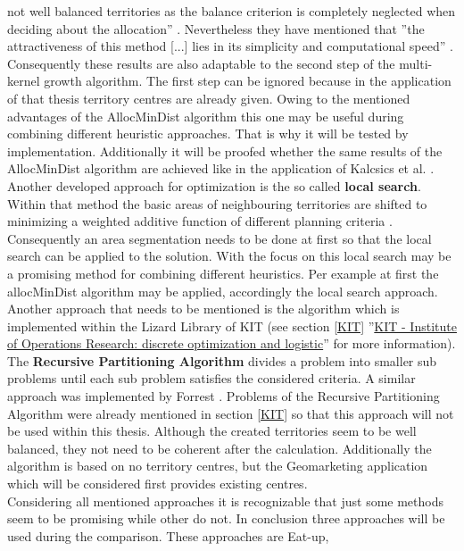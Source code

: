 not well balanced territories as the balance criterion is completely neglected when deciding about the allocation'' \cite{kalcsics2}. Nevertheless they have mentioned that ''the attractiveness of this method [...] lies in its simplicity and computational speed'' \cite{kalcsics2}. Consequently these results are also adaptable to the second step of the multi-kernel growth algorithm. The first step can be ignored because in the application of that thesis territory centres are already given. Owing to the mentioned advantages of the AllocMinDist algorithm this one may be useful during combining different heuristic approaches. That is why it will be tested by implementation. Additionally it will be proofed whether the same results of the AllocMinDist algorithm are achieved like in the application of Kalcsics et al. \cite{kalcsics2}. \\
Another developed approach for optimization is the so called \textbf{local search}. Within that method the basic areas of neighbouring territories are shifted to minimizing a weighted additive function of different planning criteria \cite{kalcsics}. Consequently an area segmentation needs to be done at first so that the local search can be applied to the solution. With the focus on this local search may be a promising method for combining different heuristics. Per example at first the allocMinDist algorithm may be applied, accordingly the local search approach. \\
Another approach that needs to be mentioned is the algorithm which is implemented within the Lizard Library of KIT (see section \ref{KIT} ''\hyperref[KIT]{KIT - Institute of Operations Research: discrete optimization and logistic}'' for more information). The \textbf{Recursive Partitioning Algorithm} divides a problem into smaller sub problems until each sub problem satisfies the considered criteria. A similar approach was implemented by Forrest \cite{forrest}. Problems of the Recursive Partitioning Algorithm were already mentioned in section \ref{KIT} so that this approach will not be used within this thesis. Although the created territories seem to be well balanced, they not need to be coherent after the calculation. Additionally the algorithm is based on no territory centres, but the Geomarketing application which will be considered first provides existing centres. \\
Considering all mentioned approaches it is recognizable that just some methods seem to be promising while other do not. In conclusion three approaches will be used during the comparison. These approaches are Eat-up,
